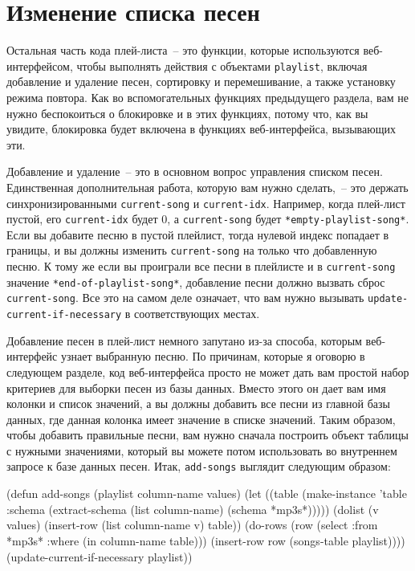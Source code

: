 \section{Изменение списка песен}
\label{ch29:change-song-list}

Остальная часть кода плей-листа~-- это функции, которые используются веб-интерфейсом, чтобы
выполнять действия с объектами \lstinline{playlist}, включая добавление и удаление песен,
сортировку и перемешивание, а также установку режима повтора. Как во вспомогательных
функциях предыдущего раздела, вам не нужно беспокоиться о блокировке и в этих функциях,
потому что, как вы увидите, блокировка будет включена в функциях веб-интерфейса, вызывающих
эти.

Добавление и удаление~-- это в основном вопрос управления списком песен. Единственная
дополнительная работа, которую вам нужно сделать,~-- это держать синхронизированными
\lstinline{current-song} и \lstinline{current-idx}. Например, когда плей-лист пустой, его
\lstinline{current-idx} будет 0, а \lstinline{current-song} будет \lstinline{*empty-playlist-song*}. Если
вы добавите песню в пустой плейлист, тогда нулевой индекс попадает в границы, и вы должны
изменить \lstinline{current-song} на только что добавленную песню. К тому же если вы проиграли все
песни в плейлисте и в \lstinline{current-song} значение \lstinline{*end-of-playlist-song*},
добавление песни должно вызвать сброс \lstinline{current-song}. Все это на самом деле означает, что
вам нужно вызывать \lstinline{update-current-if-necessary} в соответствующих местах. 

Добавление песен в плей-лист немного запутано из-за способа, которым веб-интерфейс узнает
выбранную песню. По причинам, которые я оговорю в следующем разделе, код веб-интерфейса просто
не может дать вам простой набор критериев для выборки песен из базы данных. Вместо этого он дает
вам имя колонки и список значений, а вы должны добавить все песни из главной базы данных,
где данная колонка имеет значение в списке значений. Таким образом, чтобы добавить
правильные песни, вам нужно сначала построить объект таблицы с нужными значениями, который
вы можете потом использовать во внутреннем запросе к базе данных песен. Итак,
\lstinline{add-songs} выглядит следующим образом:

\begin{myverb}
(defun add-songs (playlist column-name values)
  (let ((table (make-instance
                'table 
                :schema (extract-schema (list column-name) (schema *mp3s*)))))
    (dolist (v values) (insert-row (list column-name v) table))
    (do-rows (row (select :from *mp3s* :where (in column-name table)))
      (insert-row row (songs-table playlist))))
  (update-current-if-necessary playlist))
\end{myverb}

